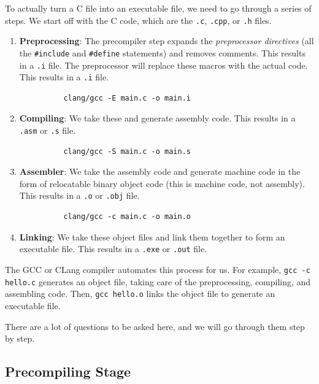 \documentclass{article}
\begin{document}
  \begin{definition}
    To actually turn a C file into an executable file, we need to go through a series of steps. We start off with the C code, which are the \texttt{.c}, \texttt{.cpp}, or \texttt{.h} files. 
    \begin{enumerate}
      \item \textbf{Preprocessing}: The precompiler step expands the \textit{preprocessor directives} (all the \texttt{\#include} and \texttt{\#define} statements) and removes comments. This results in a \texttt{.i} file. The preprocessor will replace these macros with the actual code. This results in a \texttt{.i} file.
        \begin{lstlisting}
          clang/gcc -E main.c -o main.i
        \end{lstlisting}

      \item \textbf{Compiling}: We take these and generate assembly code. This results in a \texttt{.asm} or \texttt{.s} file.
        \begin{lstlisting}
          clang/gcc -S main.c -o main.s
        \end{lstlisting}

      \item \textbf{Assembler}: We take the assembly code and generate machine code in the form of relocatable binary object code (this is machine code, not assembly). This results in a \texttt{.o} or \texttt{.obj} file.
        \begin{lstlisting}
          clang/gcc -c main.c -o main.o
        \end{lstlisting}

      \item \textbf{Linking}: We take these object files and link them together to form an executable file. This results in a \texttt{.exe} or \texttt{.out} file.
    \end{enumerate}
    The GCC or CLang compiler automates this process for us. For example, \texttt{gcc -c hello.c} generates an object file, taking care of the preprocessing, compiling, and assembling code. Then, \texttt{gcc hello.o} links the object file to generate an executable file. 
  \end{definition}

  There are a lot of questions to be asked here, and we will go through them step by step. 

  \subsection{Precompiling Stage} 
\end{document}
